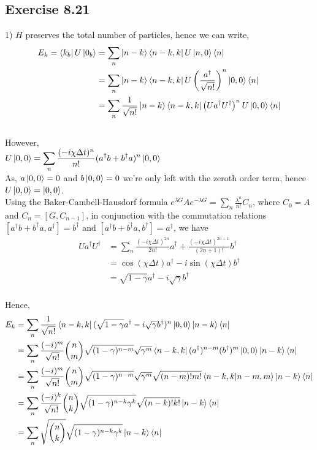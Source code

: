 \documentclass[a4paper,12pt]{article}
\begin{document}
\subsection*{Exercise 8.21}
1) $H$ preserves the total number of particles, hence we can write,\\
\begin{align*}
    E_k=\bra{k_b}U\ket{0_b}&=\displaystyle \sum_n \ket{n-k}\bra{n-k, k}U\ket{n,0}\bra{n}\\
    &=\sum_n \ket{n-k}\bra{n-k, k}U\left(\frac{a^\dagger}{\sqrt{n!}}\right)^n\ket{0,0}\bra{n}\\
    &=\sum_n \frac{1}{\sqrt{n!}}\ket{n-k}\bra{n-k, k}\left(Ua^\dagger U^\dagger\right)^nU\ket{0,0}\bra{n}
\end{align*}\\
However,\\
$U\ket{0,0}=\displaystyle \sum_n \frac{(-i\chi\Delta t)^n}{n!}(a^\dagger b +b^\dagger a)^n\ket{0,0}$\\
As, $a\ket{0,0}=0$ and $b\ket{0,0}=0$ we're only left with the zeroth order term, hence
\\$U\ket{0,0}=\ket{0,0}$.\\
Using the Baker-Cambell-Hausdorf formula $\displaystyle e^{\lambda G}Ae^{-\lambda G}=
\sum_n \frac{\lambda^n}{n!}C_n$, where $C_0=A$ and $C_n=[G,C_{n-1}]$, in conjunction with
the commutation relations
$[a^\dagger b +b^\dagger a,a^\dagger]=b^\dagger$ and $[a^\dagger b +b^\dagger a,b^\dagger]=a^\dagger$, we have\\
\begin{align*}
    Ua^\dagger U^\dagger&=\displaystyle \sum_n \frac{(-i\chi\Delta t)^{2n}}{2n!}a^\dagger+
    \frac{(-i\chi\Delta t)^{2n+1}}{(2n+1)!}b^\dagger\\
    &=\cos(\chi\Delta t)a^\dagger - i\sin(\chi\Delta t)b^\dagger\\
    &=\sqrt{1-\gamma}a^\dagger-i\sqrt{\gamma}b^\dagger
\end{align*}\\
Hence,\\
\begin{align*}
    E_k&=\displaystyle\sum_n \frac{1}{\sqrt{n!}}\bra{n-k, k}(\sqrt{1-\gamma}a^\dagger-
    i\sqrt{\gamma}b^\dagger)^n\ket{0,0}\ket{n-k}\bra{n}\\
    &=\sum_n \frac{(-i)^m}{\sqrt{n!}} {n \choose m} \sqrt{(1-\gamma)^{n-m}}\sqrt{\gamma^m}\bra{n-k, k}
    (a^\dagger)^{n-m}(b^\dagger)^m\ket{0,0}\ket{n-k}\bra{n}\\
    &=\sum_n \frac{(-i)^m}{\sqrt{n!}} {n \choose m} \sqrt{(1-\gamma)^{n-m}}\sqrt{\gamma^m}
    \sqrt{(n-m)!m!}\braket{n-k, k|n-m,m}\ket{n-k}\bra{n}\\
    &=\sum_n \frac{(-i)^k}{\sqrt{n!}} {n \choose k} \sqrt{(1-\gamma)^{n-k}\gamma^k}
    \sqrt{(n-k)!k!}\ket{n-k}\bra{n}\\
    &=\sum_n \sqrt{n \choose k} \sqrt{(1-\gamma)^{n-k}\gamma^k}\ket{n-k}\bra{n}
\end{align*}\\
\end{document}
